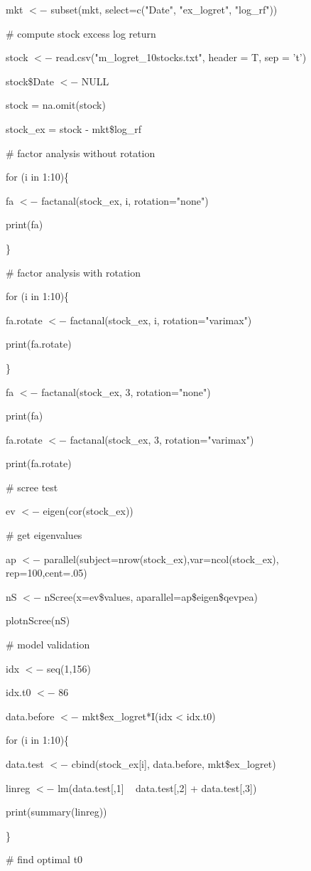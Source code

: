 \documentclass[10pt, conference]{IEEEtran}
\begin{document}
mkt $<-$ subset(mkt, select=c("Date", "ex\_logret", "log\_rf"))

\# compute stock excess log return

stock $<-$ read.csv("m\_logret\_10stocks.txt", header = T, sep = 't')

stock\$Date $<-$ NULL

stock = na.omit(stock)

stock\_ex = stock - mkt\$log\_rf


\# factor analysis without rotation

for (i in 1:10)\{

	fa $<-$ factanal(stock\_ex, i, rotation="none")

	print(fa)

\}


\# factor analysis with rotation

for (i in 1:10)\{

	fa.rotate $<-$ factanal(stock\_ex, i, rotation="varimax")

	print(fa.rotate)

\}

fa $<-$ factanal(stock\_ex, 3, rotation="none")

print(fa)

fa.rotate $<-$ factanal(stock\_ex, 3, rotation="varimax")

print(fa.rotate)

\# scree test

ev $<-$ eigen(cor(stock\_ex)) 

\# get eigenvalues

ap $<-$ parallel(subject=nrow(stock\_ex),var=ncol(stock\_ex), rep=100,cent=.05)

nS $<-$ nScree(x=ev\$values, aparallel=ap\$eigen\$qevpea)

plotnScree(nS)

\# model validation

idx $<-$ seq(1,156)

idx.t0 $<-$ 86

data.before $<-$ mkt\$ex\_logret*I(idx < idx.t0)


for (i in 1:10)\{

	data.test $<-$ cbind(stock\_ex[i], data.before, mkt\$ex\_logret)

	linreg $<-$ lm(data.test[,1] ~ data.test[,2] + data.test[,3])

	print(summary(linreg))

\}

\# find optimal t0
\end{document}
